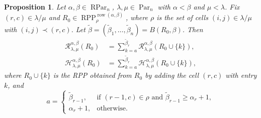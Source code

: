 \documentclass[12pt]{amsart}
\numberwithin{equation}{section}
\newtheorem{prop}[thm]{Proposition}
\theoremstyle{definition}
\newcommand\wb{\widetilde{\beta}}
\newcommand\row{\operatorname{row}}
\newcommand\Par{\operatorname{Par}}
\newcommand\RPar{\operatorname{RPar}}
\newcommand\RPP{\operatorname{RPP}}
\newcommand\lm{{\lambda/\mu}}
\newcommand\R{\mathcal{R}}
\newcommand\HH{\mathcal{H}}
\begin{document}
\begin{prop}\label{prop:H rec RPP R0}
  Let $\alpha,\beta\in\RPar_n$, $\lambda,\mu\in\Par_n$ with $\alpha<\beta$ and
  $\mu<\lambda$. Fix $(r,c)\in\lm$ and $R_0\in
  \RPP^{\row(\alpha,\beta)}_{\rho}$, where $\rho$ is the set of cells
  $(i,j)\in\lm$ with $(i,j)\prec(r,c)$. Let
  $\wb=(\wb_1,\dots,\wb_n)=B(R_0,\beta)$. Then
  \begin{align}
    \label{eq:rec M2}
    \R^{\alpha,\beta}_{\lambda,\mu}(R_0) 
    &= \sum_{k=a}^{\wb_r} \R^{\alpha,\beta}_{\lambda,\mu}(R_0\cup\{k\}),\\
    \label{eq:rec H}
    \HH^{\alpha,\beta}_{\lambda,\mu}(R_0)
    &= \sum_{k=a}^{\wb_r} \HH^{\alpha,\beta}_{\lambda,\mu}(R_0\cup\{k\}),
  \end{align}
  where $R_0\cup\{k\}$ is the RPP obtained from $R_0$ by adding the cell $(r,c)$
  with entry $k$, and
  \[
a = \begin{cases}
  \wb_{r-1}, &\mbox{if $(r-1,c)\in\rho$ and $\wb_{r-1}\ge \alpha_r+1$},\\
 \alpha_r+1, &\mbox{otherwise}.
\end{cases}
\]
\end{prop}
\end{document}
